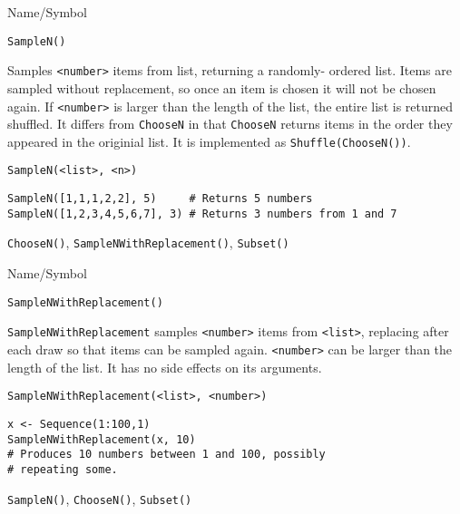 \rl


\begin{desc}{Name/Symbol}
\item[Name/Symbol]  	\verb+SampleN()+

\item[Description] Samples \verb+<number>+ items from list, returning
  a randomly- ordered list. Items are sampled without replacement, so
  once an item is chosen it will not be chosen again. If
  \verb+<number>+ is larger than the length of the list, the entire
  list is returned shuffled.  It differs from \verb+ChooseN+ in that
  \verb+ChooseN+ returns items in the order they appeared in the
  originial list.  It is implemented as \verb+Shuffle(ChooseN())+.

\item[Usage]       	
\begin{verbatim}
SampleN(<list>, <n>)
\end{verbatim}

\item[Example]   	
\begin{verbatim}
SampleN([1,1,1,2,2], 5)     # Returns 5 numbers
SampleN([1,2,3,4,5,6,7], 3) # Returns 3 numbers from 1 and 7
\end{verbatim}

\item[See Also]    	\verb+ChooseN()+, \verb+SampleNWithReplacement()+, \verb+Subset()+
\end{desc}

\rl


\begin{desc}{Name/Symbol}
\item[Name/Symbol] 	\verb+SampleNWithReplacement()+

\item[Description] \verb+SampleNWithReplacement+ samples
  \verb+<number>+ items from \verb+<list>+, replacing after each draw
  so that items can be sampled again.  \verb+<number>+ can be larger
  than the length of the list. It has no side effects on its
  arguments.  
\item[Usage]        	
\begin{verbatim}
SampleNWithReplacement(<list>, <number>)
\end{verbatim}

\item[Example] 	
\begin{verbatim}
x <- Sequence(1:100,1)
SampleNWithReplacement(x, 10)
# Produces 10 numbers between 1 and 100, possibly 
# repeating some.
\end{verbatim}

\item[See Also]     	\verb+SampleN()+, \verb+ChooseN()+, \verb+Subset()+
\end{desc}

